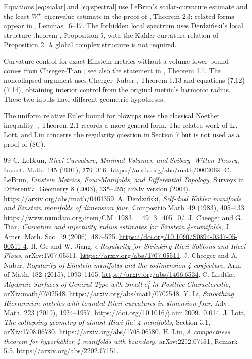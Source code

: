\documentclass[a4paper,11pt]{article}
\theoremstyle{paper}
\numberwithin{equation}{section}
\begin{document}
Equations \eqref{eq:scalar} and \eqref{eq:spectral} use LeBrun's scalar-curvature estimate and the least-$W^+$-eigenvalue estimate in the proof of \cite{lebrun2001}, Theorem 2.3; related forms appear in \cite{lebrun2004}, Lemmas 16--17. The forbidden local spectrum uses Derdzi\'nski's local structure theorem \cite{derd}, Proposition 5, with the K\"ahler curvature relation of Proposition 2. A global complex structure is not required.

Curvature control for exact Einstein metrics without a volume lower bound comes from Cheeger--Tian \cite{ct}; see also the statement in \cite{gejiang}, Theorem 1.1. The noncollapsed argument uses Cheeger--Naber \cite{cn}, Theorem 1.13 and equations (7.12)--(7.14), obtaining interior control from the original metric's harmonic radius. These two inputs have different geometric hypotheses.

The uniform relative Euler bound for blowups uses the classical Noether inequality; \cite{liedtke}, Theorem 2.1 records a more general form. The related work of Li, Lott, and Liu \cite{li,lott,liu} concerns the regularity question in Section 7 but is not used as a proof of (SC).

\begin{thebibliography}{99}
C. LeBrun, \emph{Ricci Curvature, Minimal Volumes, and Seiberg--Witten Theory}, Invent. Math. 145 (2001), 279--316.
\url{https://arxiv.org/abs/math/0003068}.
C. LeBrun, \emph{Einstein Metrics, Four-Manifolds, and Differential Topology}, Surveys in Differential Geometry 8 (2003), 235--255; arXiv version (2004).
\url{https://arxiv.org/abs/math/0404359}.
A. Derdzi\'nski, \emph{Self-dual K\"ahler manifolds and Einstein manifolds of dimension four}, Compositio Math. 49 (1983), 405--433.
\url{https://www.numdam.org/item/CM_1983__49_3_405_0/}.
J. Cheeger and G. Tian, \emph{Curvature and injectivity radius estimates for Einstein 4-manifolds}, J. Amer. Math. Soc. 19 (2006), 487--525.
\url{https://doi.org/10.1090/S0894-0347-05-00511-4}.
H. Ge and W. Jiang, \emph{$\epsilon$-Regularity for Shrinking Ricci Solitons and Ricci Flows}, arXiv:1707.05511.
\url{https://arxiv.org/abs/1707.05511}.
J. Cheeger and A. Naber, \emph{Regularity of Einstein manifolds and the codimension 4 conjecture}, Ann. of Math. 182 (2015), 1093--1165.
\url{https://arxiv.org/abs/1406.6534}.
C. Liedtke, \emph{Algebraic Surfaces of General Type with Small $c_1^2$ in Positive Characteristic}, arXiv:math/0702548.
\url{https://arxiv.org/abs/math/0702548}.
Y. Li, \emph{Smoothing Riemannian metrics with bounded Ricci curvatures in dimension four}, Adv. Math. 223 (2010), 1924--1957.
\url{https://doi.org/10.1016/j.aim.2009.10.014}.
J. Lott, \emph{The collapsing geometry of almost Ricci-flat 4-manifolds}, Section 3.1, arXiv:1708.06780.
\url{https://arxiv.org/abs/1708.06780}.
H. Liu, \emph{A compactness theorem for hyperkähler 4-manifolds with boundary}, arXiv:2202.07151, Remark 5.5.
\url{https://arxiv.org/abs/2202.07151}.
\end{thebibliography}
\end{document}

